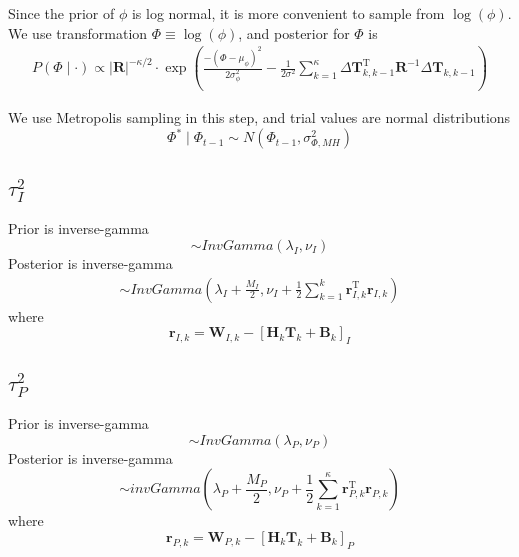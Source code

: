 \documentclass[12pt, letterpaper]{article}
\begin{document}
Since the prior of $\phi$ is log normal, it is more convenient to sample from $\log(\phi)$. We use transformation $\Phi \equiv \log(\phi)$, and posterior for $\Phi$ is
\begin{align}
P(\Phi \mid \cdot) \propto|\mathbf{R}|^{-\kappa / 2} \cdot  \exp \left(\frac{-\left(\Phi-\mu_{\phi}\right)^{2}}{2 \sigma_{\phi}^{2}}-\frac{1}{2 \sigma^{2}} \sum_{k=1}^{\kappa} \Delta \mathbf{T}_{k, k-1}^{\mathrm{T}} \mathbf{R}^{-1} \Delta \mathbf{T}_{k, k-1}\right)
\end{align}

We use Metropolis sampling in this step, and trial values are normal distributions
\begin{equation}
\Phi^{*} \mid \Phi_{t-1} \sim N\left(\Phi_{t-1}, \sigma_{\Phi, M H}^{2}\right)
\end{equation}

\subsection{$\tau_I^2$}
Prior is inverse-gamma
\begin{equation}
	\sim InvGamma \left(\lambda_{I}, \nu_{I}\right)
\end{equation}
Posterior is inverse-gamma
\begin{align}
\sim  InvGamma \left(\lambda_{I}+\frac{M_{I}}{2}, \nu_{I}+\frac{1}{2} \sum_{k=1}^{k} \mathbf{r}_{I, k}^{\mathrm{T}} \mathbf{r}_{I, k}\right)
\end{align}
where
\begin{equation}
\mathbf{r}_{I, k}=\mathbf{W}_{I, k}-\left[\mathbf{H}_{k} \mathbf{T}_{k}+\mathbf{B}_{k}\right]_{I}
\end{equation}

\subsection{$\tau_P^2$}
Prior is inverse-gamma
\begin{equation}
	\sim InvGamma \left(\lambda_{P}, \nu_{P}\right)
\end{equation}
Posterior is inverse-gamma
\begin{equation}
\sim  invGamma \left(\lambda_{P}+\frac{M_{P}}{2}, \nu_{P}+\frac{1}{2} \sum_{k=1}^{\kappa} \mathbf{r}_{P, k}^{\mathrm{T}} \mathbf{r}_{P, k}\right)
\end{equation}
where
\begin{equation}
\mathbf{r}_{P, k}=\mathbf{W}_{P, k}-\left[\mathbf{H}_{k} \mathbf{T}_{k}+\mathbf{B}_{k}\right]_{P}
\end{equation}
\end{document}
